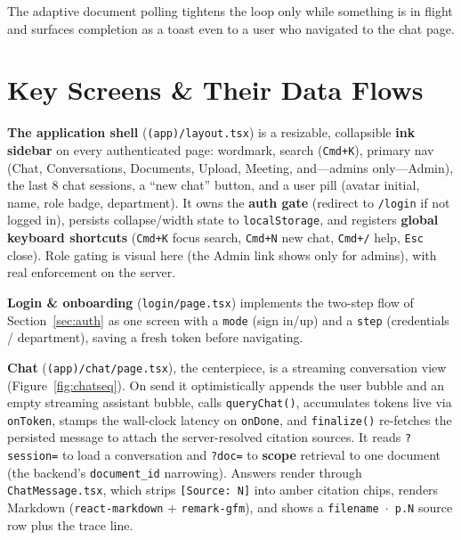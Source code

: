 \documentclass[11pt,a4paper,oneside]{report}
\newcommand{\code}[1]{\texttt{#1}}
\begin{document}
The adaptive document polling tightens the loop only while something is in flight and surfaces
completion as a toast even to a user who navigated to the chat page.

\section{Key Screens \& Their Data Flows}
\textbf{The application shell} (\code{(app)/layout.tsx}) is a resizable, collapsible \textbf{ink
sidebar} on every authenticated page: wordmark, search (\code{Cmd+K}), primary nav (Chat,
Conversations, Documents, Upload, Meeting, and---admins only---Admin), the last 8 chat sessions, a
``new chat'' button, and a user pill (avatar initial, name, role badge, department). It owns the
\textbf{auth gate} (redirect to \code{/login} if not logged in), persists collapse/width state to
\code{localStorage}, and registers \textbf{global keyboard shortcuts} (\code{Cmd+K} focus search,
\code{Cmd+N} new chat, \code{Cmd+/} help, \code{Esc} close). Role gating is visual here (the Admin
link shows only for admins), with real enforcement on the server.

\textbf{Login \& onboarding} (\code{login/page.tsx}) implements the two-step flow of
Section~\ref{sec:auth} as one screen with a \code{mode} (sign in/up) and a \code{step} (credentials /
department), saving a fresh token before navigating.

\textbf{Chat} (\code{(app)/chat/page.tsx}), the centerpiece, is a streaming conversation view
(Figure~\ref{fig:chatseq}). On send it optimistically appends the user bubble and an empty streaming
assistant bubble, calls \code{queryChat()}, accumulates tokens live via \code{onToken}, stamps the
wall-clock latency on \code{onDone}, and \code{finalize()} re-fetches the persisted message to attach
the server-resolved citation sources. It reads \code{?session=} to load a conversation and \code{?doc=}
to \textbf{scope} retrieval to one document (the backend's \code{document\_id} narrowing). Answers
render through \code{ChatMessage.tsx}, which strips \code{[Source: N]} into amber citation chips,
renders Markdown (\code{react-markdown} + \code{remark-gfm}), and shows a \code{filename $\cdot$ p.N}
source row plus the trace line.
\end{document}

